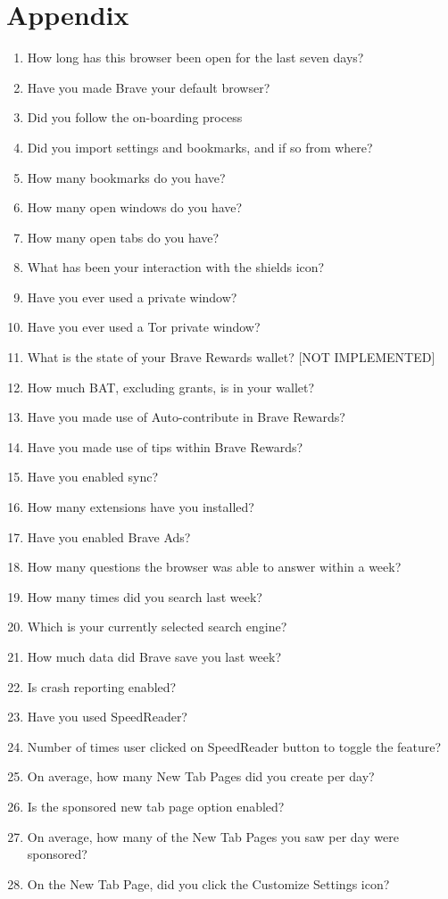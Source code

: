 \chapter{Appendix}
\label{chap:appendix}

\begin{enumerate}
    \label{list:brave_question}
    \item How long has this browser been open for the last seven days?
    \item Have you made Brave your default browser?
    \item Did you follow the on-boarding process
    \item Did you import settings and bookmarks, and if so from where?
    \item How many bookmarks do you have?
    \item How many open windows do you have?
    \item How many open tabs do you have?
    \item What has been your interaction with the shields icon?
    \item Have you ever used a private window?
    \item Have you ever used a Tor private window?
    \item What is the state of your Brave Rewards wallet? [NOT IMPLEMENTED]
    \item How much BAT, excluding grants, is in your wallet?
    \item  Have you made use of Auto-contribute in Brave Rewards?
    \item Have you made use of tips within Brave Rewards?
    \item Have you enabled sync?
    \item How many extensions have you installed?
    \item Have you enabled Brave Ads?
    \item How many questions the browser was able to answer within a week?
    \item How many times did you search last week?
    \item Which is your currently selected search engine?
    \item How much data did Brave save you last week?
    \item Is crash reporting enabled?
    \item Have you used SpeedReader?
    \item Number of times user clicked on SpeedReader button to toggle the feature?
    \item On average, how many New Tab Pages did you create per day?
    \item Is the sponsored new tab page option enabled?
    \item On average, how many of the New Tab Pages you saw per day were sponsored?
    \item On the New Tab Page, did you click the Customize Settings icon?
\end{enumerate}
